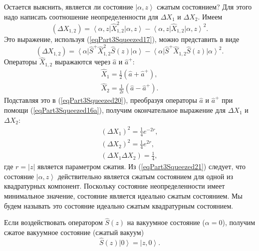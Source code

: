 Остается выяснить, является ли состояние $\left|\alpha, z\right>$
сжатым состоянием? Для этого надо написать соотношение
неопределенности для $\Delta X_1$  и $\Delta X_2$. Имеем
\begin{equation}
\left(\Delta X_{1,2}\right) = 
\left<\alpha, z\right| \hat{X}_{1,2}^2\left|\alpha, z\right> -
\left<\alpha, z\right| \hat{X}_{1,2}\left|\alpha, z\right>^2.
\nonumber
\end{equation}
Это выражение, используя (\ref{eqPart3Squeezed17}), можно представить в
виде 
\begin{equation}
\left(\Delta X_{1,2}\right) = 
\left<\alpha\right|\hat{S}^{+} \hat{X}_{1,2}^2\hat{S}\left(z\right)\left|\alpha\right> -
\left<\alpha\right|\hat{S}^{+} \hat{X}_{1,2}\hat{S}\left(z\right)\left|\alpha\right>^2.
\label{eqPart3Squeezed20}
\end{equation}
Операторы $\hat{X}_{1,2}$ выражаются через $\hat{a}$ и $\hat{a}^{+}$:
\begin{eqnarray}
\hat{X}_1 = \frac{1}{2}\left(\hat{a} + \hat{a}^{+}\right), 
\nonumber \\
\hat{X}_2 = \frac{1}{2 i}\left(\hat{a} - \hat{a}^{+}\right).
\nonumber
\end{eqnarray}
Подставляя это в (\ref{eqPart3Squeezed20}), преобразуя операторы
$\hat{a}$ и $\hat{a}^{+}$ при помощи (\ref{eqPart3Squeezed16a}),
получим окончательное выражение для $\Delta X_1$  и $\Delta X_2$:
\begin{eqnarray}
\left(\Delta X_1\right)^2 = \frac{1}{4}e^{-2 r},
\nonumber \\
\left(\Delta X_2\right)^2 = \frac{1}{4}e^{2 r},
\nonumber \\
\left(\Delta X_1 \Delta X_2\right) = \frac{1}{4},
\label{eqPart3Squeezed21}
\end{eqnarray}
где $r = \left|z\right|$ является параметром сжатия. Из
(\ref{eqPart3Squeezed21}) следует, что состояние $\left|\alpha,
z\right>$ действительно является сжатым состоянием для одной из
квадратурных компонент. Поскольку состояние неопределенности имеет
минимальное значение, состояние является идеально сжатым
состоянием. Мы будем называть это состояние идеально сжатым
квадратурным состоянием.

Если воздействовать оператором $\hat{S}\left(z\right)$ на вакуумное
состояние ($\alpha = 0$), получим сжатое вакуумное состояние (сжатый
вакуум)
\begin{equation}
\hat{S}\left(z\right)\left|0\right> = \left|z, 0\right>.
\nonumber
\end{equation}

